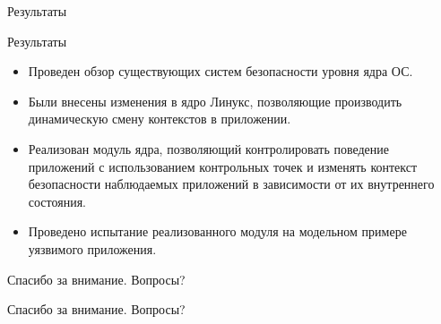 \documentclass{beamer}
\begin{document}
\begin{frame}{Результаты}
\begin{block}{Результаты}
\begin{itemize}
\item Проведен обзор существующих систем безопасности уровня ядра ОС.
\item Были внесены изменения в ядро Линукс, позволяющие производить
        динамическую смену контекстов в приложении.
\item Реализован модуль ядра, позволяющий контролировать поведение
        приложений с использованием контрольных точек и изменять
        контекст безопасности наблюдаемых приложений в зависимости от
        их внутреннего состояния.

\item Проведено испытание реализованного модуля на модельном примере
        уязвимого приложения.
\end{itemize}
\end{block}
\end{frame}

\begin{comment}
\begin{frame}{Характеристика реализации}
 
\begin{tabular}{| l | c | } 
\hline
  Язык программирования & C, Python\\ \hline
  Операционная система &  Linux \\ \hline  
  Кол-во строк кода & n \\ 
\hline
\end{tabular}
\end{frame}

\begin{frame}{Результаты}

\begin{block}{Результаты}
\begin{itemize}
 \item Проведен обзор и сравнительный анализ средств построения моделей нормального поведения приложений.
 \item Разработан метод автоматизированного построения нормального поведения приложений для ОС Linux и языка Си.
 \item Реализовано средство для приложений, написанных для ОС Linux на языке Си, позволяющие разбивать программу на набор блоков.
 \item Проведено испытание реализованного средства на уязвимом приложений.
\end{itemize}
\end{block}
\end{frame}
\end{comment}



  \begin{frame}{Спасибо за внимание. Вопросы?}
\begin{center}
\LARGE{Спасибо за внимание. Вопросы?}
\end{center}

   
  \end{frame}
 
\end{document}
